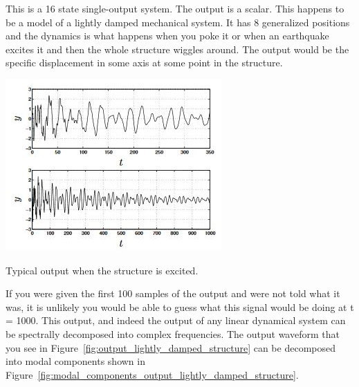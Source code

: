 \documentclass{../tufte-handout}
\begin{document}
This is a 16 state single-output system. The output is a scalar. This happens to be a model of a lightly damped mechanical system. It has 8 generalized positions and the dynamics is what happens when you poke it or when an earthquake excites it and then the whole structure wiggles around. The output would be the specific displacement in some axis at some point in the structure. 


\begin{marginfigure}
  \includegraphics[width=\linewidth]{output_lightly_damped_structure}
  \caption{Typical output when the structure is excited.}
  \label{fig:output_lightly_damped_structure}
\end{marginfigure}

If you were given the first 100 samples of the output and were not told what it was, it is unlikely you would be able to guess what this signal would be doing at t = 1000. This output, and indeed the output of any linear dynamical system can be spectrally decomposed into complex frequencies. The output waveform that you see in Figure~\ref{fig:output_lightly_damped_structure} can be decomposed into modal components shown in Figure~\ref{fig:modal_components_output_lightly_damped_structure}.
\end{document}
